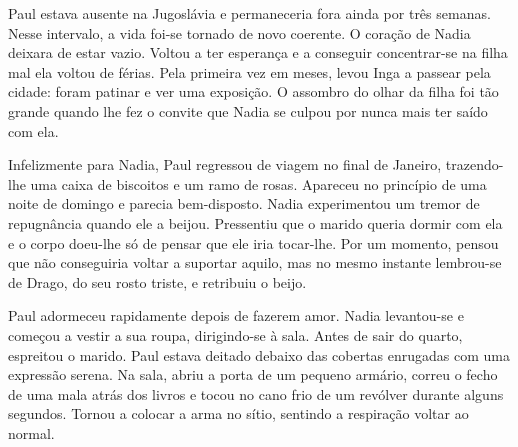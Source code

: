 Paul estava ausente na Jugoslávia e permaneceria fora ainda por três
semanas. Nesse intervalo, a vida foi-se tornado de novo coerente. O
coração de Nadia deixara de estar vazio. Voltou a ter esperança e a
conseguir concentrar-se na filha mal ela voltou de férias. Pela primeira vez em meses, levou
Inga a passear pela cidade: foram patinar e ver uma exposição. O
assombro do olhar da filha foi tão grande quando lhe fez o convite que
Nadia se culpou por nunca mais ter saído com ela.

Infelizmente para Nadia, Paul regressou de viagem no final de Janeiro,
trazendo-lhe uma caixa de biscoitos e um ramo de rosas. Apareceu no
princípio de uma noite de domingo e parecia bem-disposto. Nadia
experimentou um tremor de repugnância quando ele a beijou. Pressentiu
que o marido queria dormir com ela e o corpo doeu-lhe só de pensar que
ele iria tocar-lhe. Por um momento, pensou que não conseguiria voltar a
suportar aquilo, mas no mesmo instante lembrou-se de Drago, do seu rosto
triste, e retribuiu o beijo.

Paul adormeceu rapidamente depois de fazerem amor. Nadia levantou-se e
começou a vestir a sua roupa, dirigindo-se à sala. Antes de sair do
quarto, espreitou o marido. Paul estava deitado debaixo das cobertas
enrugadas com uma expressão serena. Na sala, abriu a porta de um
pequeno armário, correu o fecho de uma mala atrás dos livros e tocou no
cano frio de um revólver durante alguns segundos. Tornou a colocar a
arma no sítio, sentindo a respiração voltar ao normal.

